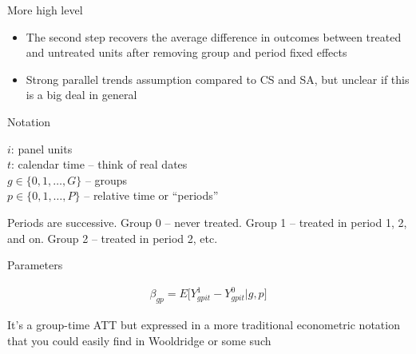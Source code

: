 \documentclass{beamer}
\begin{document}
\begin{frame}{More high level}

\begin{itemize}
\item The second step recovers the average difference in outcomes between treated and untreated units after removing group and period fixed effects
\item Strong parallel trends assumption compared to CS and SA, but unclear if this is a big deal in general
\end{itemize}

\end{frame}

\begin{frame}{Notation}

$i$: panel units \\
$t$: calendar time -- think of real dates\\
$g\in \{0,1, \dots , G \}$ -- groups\\
$p \in \{0,1, \dots , P \}$  -- relative time or ``periods''\\

\bigskip

Periods are successive.  Group 0 -- never treated. Group 1 -- treated in period 1, 2, and on.  Group 2 -- treated in period 2, etc.

\end{frame}

\begin{frame}{Parameters}

\begin{eqnarray*}
\beta_{gp} = E \bigg [ Y^1_{gpit} - Y^0_{gpit} | g,p \bigg ]
\end{eqnarray*}

\bigskip

It's a group-time ATT but expressed in a more traditional econometric notation that you could easily find in Wooldridge or some such

\end{frame}
\end{document}
